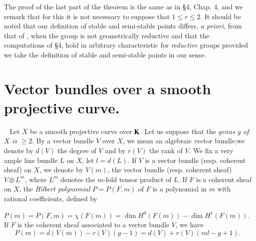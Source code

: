 The proof of the last part of the theorem is the same as in \S4, Chap. 4, \cite{art18-key5} and we remark that for this it is not necessary to suppose that $1\leq r\leq 2$. It should be noted that our definition of stable and semi-stable points differs, {\em a priori}, from that of \cite{art18-key4}, when the group is not geometrically reductive and that the computations of \S4, \cite{art18-key4} hold in arbitrary characteristic for {\em reductive} groups provided we take the definition of stable and semi-stable points in our sense.

\section{Vector bundles over a smooth projective curve.}\label{art18-sec3}

~
\smallskip
\noindent
Let $X$ be a smooth projective curve over $\mathbf{K}$. Let us suppose that the {\em genus $g$ of $X$ is $\geq 2$}. By a vector bundle $V$ over $X$, we mean an algebraic vector bundle;\pageoriginale we denote by $d(V)$ the degree of $V$ and by $r(V)$ the rank of $V$. We fix a very ample line bundle $L$ on $X$, let $l=d(L)$. If $V$ is a vector bundle (resp. coherent sheaf) on $X$, we denote by $V(m)$, the vector bundle (resp. coherent sheaf) $V\otimes L^{m}$, where $L^{m}$ denotes the $m$-fold tensor product of $L$. If $F$ is a coherent sheaf on $X$, the {\em Hilbert polynomial} $P=P(F,m)$ of $F$ is a polynomial in $m$ with rational coefficients, defined by

$P(m)=P(F,m)=\chi(F(m))=\dim H^{0}(F(m))-\dim H^{1}(F(m))$. If $F$ is the coherent sheaf associated to a vector bundle $V$, we have
$$
P(m)=d(V(m))-r(V)(g-1)=d(V)+r(V)(ml-g+1).
$$

